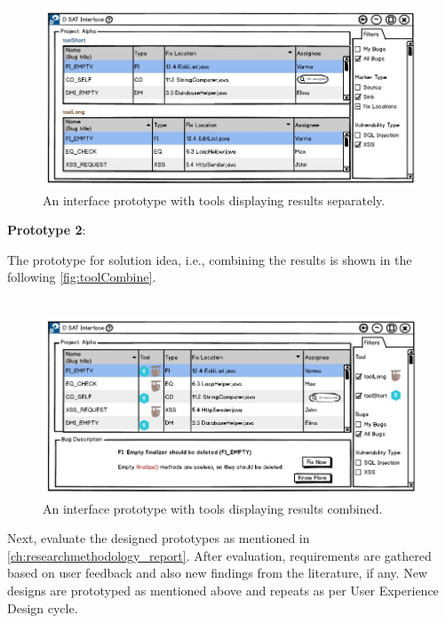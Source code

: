 \begin{figure}[hbt!]
	\centering
	\includegraphics[width=\linewidth]{figures/d_seperate}
	\caption{An interface prototype with tools displaying results separately.}
	\label{fig:toolSeperate}
\end{figure}

\textbf{Prototype 2}:

The prototype for solution idea, i.e., combining the results is shown in the following \autoref{fig:toolCombine}. \\ \\

\begin{figure}[hbt!]
	\centering
	\includegraphics[width=\linewidth]{figures/d_combine}
	\caption{An interface prototype with tools displaying results combined.}
	\label{fig:toolCombine}
\end{figure}

Next, evaluate the designed prototypes as mentioned in \autoref{ch:researchmethodology_report}. After evaluation, requirements are gathered based on user feedback and also new findings from the literature, if any. New designs are prototyped as mentioned above and repeats as per User Experience Design cycle. \\ \\

